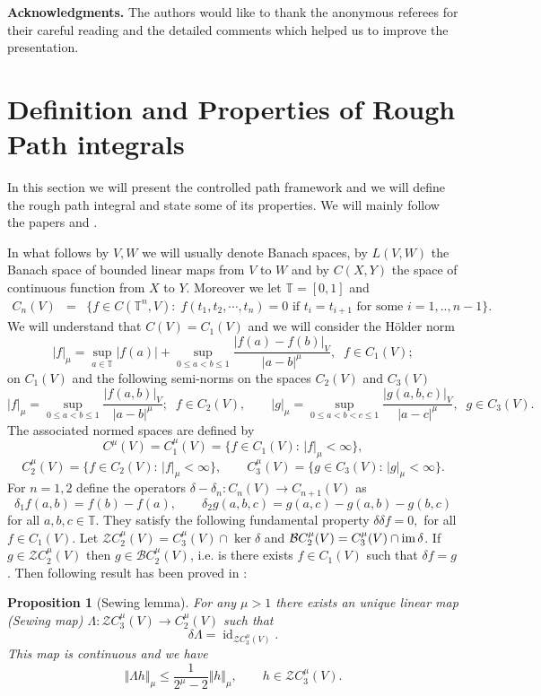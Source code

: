 \documentclass[11pt,a4paper,reqno]{amsart}%
\theoremstyle{plain}
\theoremstyle{remark}
\theoremstyle{plain}
\newtheorem{proposition}[theorem]{Proposition}
\numberwithin{equation}{section}
\newcommand\id{\operatorname{id}}
\def\im{\mbox{im\,}}
\def\supl{\sup\limits}
\def\supl{\mathop{\sup}\limits}
\begin{document}
\bigskip
\textbf{Acknowledgments.} The authors would like to thank the anonymous referees for their careful reading and the detailed comments which helped us to improve the presentation.
\vfill\newpage

\section{Definition and Properties of Rough Path integrals}
In this section we will present the controlled path framework and we will  define the rough path integral and state some of its properties. We will mainly follow the papers \cite{[Gubinelli-2004]} and
\cite{[Bess+Gub_2005]}.

 In what follows by $V,W$ we will usually denote  Banach spaces, by $L(V,W)$ the Banach space of bounded linear maps from $V$ to $W$ and by $C(X,Y)$ the space of continuous function from $X$ to $Y$. Moreover we let $\mathbb{T}=[0,1]$ and
\begin{eqnarray*}
C_n(V)&=&\{f\in C(\mathbb{T}^n,V):\; f(t_1,t_2,\cdots,t_n)=0 \text{ if  $t_i=t_{i+1}$ for some $i=1,..,n-1$}\}.
\end{eqnarray*}
We will understand that $C(V) = C_1(V)$ and  we will consider the H\"older norm
$$
\vert f\vert_{\mu}=\supl_{a\in\mathbb{T}}|f(a)|+ \supl_{0\le a<b\le 1}\frac{\vert f(a)-f(b)\vert_{V}}{\vert a-b\vert^{\mu}}, \;\; f\in C_1(V);
$$
on $C_1(V)$ and the following semi-norms on the spaces 
 $C_2(V)$ and $ C_3(V)$
$$
\vert f\vert_{\mu}=\supl_{0\le a<b\le 1}\frac{\vert f(a,b)\vert_{V}}{\vert a-b\vert^{\mu}};\;\; f\in C_2(V), 
\qquad
\vert g\vert_{\mu}=\supl_{0\le a<b<c\le 1}\frac{\vert g(a,b,c)\vert_{V}}{\vert a-c\vert^{\mu}}, \;\; g\in C_3(V).
$$
The  associated normed spaces are defined by 
$$
C^\mu(V)= C_1^\mu(V) = \{f\in C_1(V):\, \vert f\vert_{\mu}<\infty\},
$$
$$
C_2^\mu(V) = \{f\in C_2(V):\, \vert f\vert_{\mu}<\infty\},
\qquad
C_3^\mu(V) = \{g\in C_3(V):\, \vert g\vert_{\mu}<\infty\}.
$$
For $n=1,2$ define the operators $\delta-\delta_n:C_n(V)\to C_{n+1}(V)$ as
$$
\delta_1 f(a,b) = f(b)-f(a),\qquad
\delta_2 g(a,b,c) = g(a,c)-g(a,b)-g(b,c)
$$
for all $a,b,c\in\mathbb{T}$. They satisfy the following fundamental property
$
\delta\delta f=0,
$ for all $f\in C_1(V)$. Let
$\mathcal{Z}C_2^\mu(V) = C_3^\mu(V)\cap\ker\delta $ and $\mathcal{B}C_2^\mu(V) = C_3^\mu(V)\cap\im\delta $. If $g\in \mathcal{Z} C_2^\mu(V)$ then  $g\in\mathcal{B}C_2^\mu(V)$, i.e. is there exists $f\in C_1(V)$ such that $\delta f = g$.
Then following  result  has been proved in
\cite{[Gubinelli-2004]}:
\begin{proposition}[Sewing lemma]
For any $\mu>1$ there exists an unique  linear map (Sewing map)
$\Lambda:\mathcal{Z}C_3^{\mu}(V)\to C_2^{\mu}(V)$ such that
$$
\delta\Lambda=\id_{\mathcal{Z}C_3^{\mu}(V)}.
$$
This map is continuous and we have
$$
\Vert \Lambda h\Vert_{\mu}\leq
\frac{1}{2^{\mu}-2}\Vert h\Vert_{\mu},\qquad h\in\mathcal{Z}C_3^{\mu}(V).
$$
\end{proposition}
\end{document}
